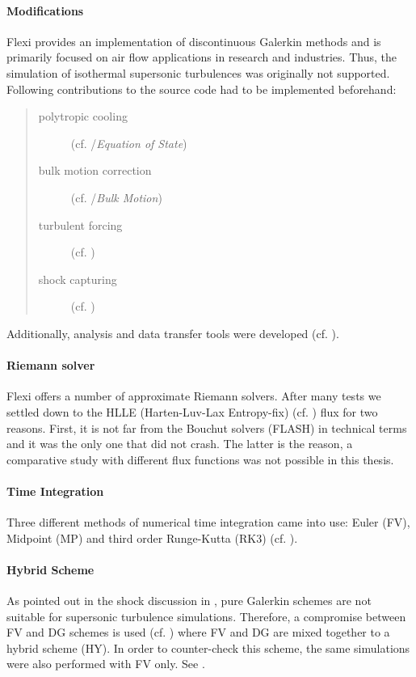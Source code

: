 \paragraph{Modifications}
Flexi provides an implementation of discontinuous Galerkin methods and is
primarily focused on air flow applications in research and industries. Thus,
the simulation of isothermal supersonic turbulences was originally not
supported.  Following contributions to the source code had to be implemented
beforehand:
\begin{quote}
\begin{description}
    \item [polytropic cooling] (cf. /\emph{Equation of State})
    \item [bulk motion correction] (cf. /\emph{Bulk Motion})
    \item [turbulent forcing] (cf. )
    \item [shock capturing] (cf. )
\end{description}
\end{quote}
Additionally, analysis and data transfer tools were developed (cf. ).

\paragraph{Riemann solver}
Flexi offers a number of approximate Riemann solvers. After many tests we
settled down to the HLLE (Harten-Luv-Lax Entropy-fix) (cf. \cite{balsara_2010})
flux for two reasons.  First, it is not far from the Bouchut solvers (FLASH) in
technical terms and it was the only one that did not crash. The latter is the
reason, a comparative study with different flux functions was not possible in this
thesis.

\paragraph{Time Integration}
Three different methods of numerical time integration came into use: Euler (FV),
Midpoint (MP) and third order Runge-Kutta (RK3) (cf. ).

\paragraph{Hybrid Scheme}
As pointed out in the shock discussion in , pure Galerkin schemes
are not suitable for supersonic turbulence simulations. Therefore, a compromise
between FV and DG schemes is used (cf. ) where FV and DG
are mixed together to a hybrid scheme (HY). In order to counter-check this scheme,
the same simulations were also performed with FV only. See .


